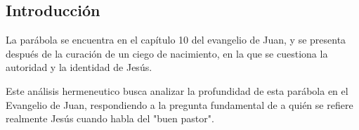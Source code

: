 \begin{multicols}{2}
    \begin{minipage}[t]{0.45\textwidth} %
        \tableofcontents
    \end{minipage}
    \hfill
    \begin{minipage}[t]{0.45\textwidth}
        \section{Introducción}

        La parábola se encuentra en el capítulo 10 del evangelio de Juan, y se presenta
        después de la curación de un ciego de nacimiento, en la que se cuestiona la
        autoridad y la identidad de Jesús.

        Este análisis hermeneutico busca analizar la profundidad de esta parábola en el Evangelio de Juan,
        respondiendo a la pregunta fundamental de a quién se refiere realmente 
        Jesús cuando habla del "buen pastor".

    \end{minipage}
\end{multicols}
